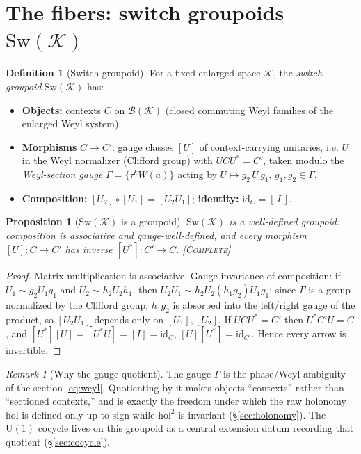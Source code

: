 \documentclass[11pt]{article}
\newtheorem{proposition}{Proposition}
\theoremstyle{definition}
\newtheorem{definition}{Definition}
\theoremstyle{remark}
\newtheorem*{remark}{Remark}
\newcommand{\K}{\mathcal K}
\newcommand{\B}{\mathcal B}
\newcommand{\Sw}{\mathrm{Sw}}
\newcommand{\U}{\mathrm{U}}
\newcommand{\Wop}{W}
\newcommand{\id}{\mathrm{id}}
\newcommand{\hol}{\mathrm{hol}}
\newcommand{\STC}{{\normalfont\textsc{[Complete]}}}
\begin{document}
\section{The fibers: switch groupoids \texorpdfstring{$\Sw(\K)$}{Sw(K)}}
\label{sec:fiber}

\begin{definition}[Switch groupoid]\label{def:sw}
For a fixed enlarged space $\K$, the \emph{switch groupoid} $\Sw(\K)$ has:
\begin{itemize}[leftmargin=1.4em]
\item \textbf{Objects:} contexts $C$ on $\B(\K)$ (closed commuting Weyl families of the
enlarged Weyl system).
\item \textbf{Morphisms} $C\to C'$: gauge classes $[U]$ of context-carrying unitaries,
i.e. $U$ in the Weyl normalizer (Clifford group) with $UCU^\ast=C'$, taken modulo the
\emph{Weyl-section gauge} $\Gamma=\{\tau^{k}\Wop(a)\}$ acting by
$U\mapsto g_2\,U\,g_1$, $g_1,g_2\in\Gamma$.
\item \textbf{Composition:} $[U_2]\circ[U_1]=[U_2U_1]$; \textbf{identity:}
$\id_C=[\,I\,]$.
\end{itemize}
\end{definition}

\begin{proposition}[$\Sw(\K)$ is a groupoid]\label{prop:fibergpd}
$\Sw(\K)$ is a well-defined groupoid: composition is associative and gauge-well-defined,
and every morphism $[U]:C\to C'$ has inverse $[U^\ast]:C'\to C$. \STC
\end{proposition}
\begin{proof}
Matrix multiplication is associative. Gauge-invariance of composition: if
$U_1\sim g_2U_1g_1$ and $U_2\sim h_2U_2h_1$, then $U_2U_1\sim
h_2U_2(h_1g_2)U_1g_1$; since $\Gamma$ is a group normalized by the Clifford group,
$h_1g_2$ is absorbed into the left/right gauge of the product, so $[U_2U_1]$ depends
only on $[U_1],[U_2]$. If $UCU^\ast=C'$ then $U^\ast C'U=C$, and
$[U^\ast][U]=[U^\ast U]=[I]=\id_C$, $[U][U^\ast]=\id_{C'}$. Hence every arrow is
invertible. \end{proof}

\begin{remark}[Why the gauge quotient]
The gauge $\Gamma$ is the phase/Weyl ambiguity of the section \eqref{eq:weyl}. Quotient\-ing
by it makes objects ``contexts'' rather than ``sectioned contexts,'' and is exactly the
freedom under which the raw holonomy $\hol$ is defined only up to sign while $\hol^2$ is
invariant (\S\ref{sec:holonomy}). The $\U(1)$ cocycle lives on this groupoid as a
central extension datum recording that quotient (\S\ref{sec:cocycle}).
\end{remark}
\end{document}
